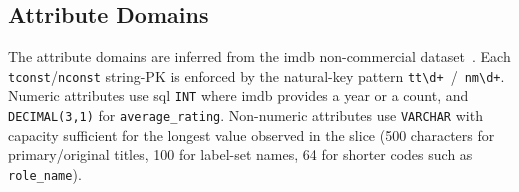 \subsection{Attribute Domains}
\label{sec:attr-domains}

The attribute domains are inferred from the \ac{imdb} non-commercial dataset~\cite{imdb-noncommercial}. Each \texttt{tconst}/\texttt{nconst} string-PK is enforced by the natural-key pattern \texttt{tt\textbackslash d+}~/~\texttt{nm\textbackslash d+}. Numeric attributes use \ac{sql} \texttt{INT} where \ac{imdb} provides a year or a count, and \texttt{DECIMAL(3,1)} for \texttt{average\_rating}. Non-numeric attributes use \texttt{VARCHAR} with capacity sufficient for the longest value observed in the slice (500 characters for primary/original titles, 100 for label-set names, 64 for shorter codes such as \texttt{role\_name}).

